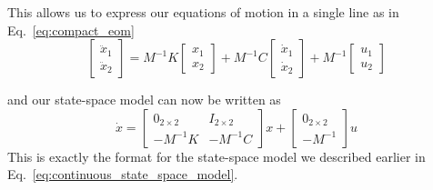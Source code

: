 This allows us to express our equations of motion in a single line as in Eq.~\ref{eq:compact_eom}
\begin{equation}
    \begin{bmatrix}
        \ddot{x}_1 \\ \ddot{x}_2
    \end{bmatrix}
    = M^{-1}K
    \begin{bmatrix}
        x_1 \\ x_2
    \end{bmatrix}
    + M^{-1}C
    \begin{bmatrix}
        \dot{x}_1 \\ \dot{x}_2
    \end{bmatrix}
    + M^{-1}
    \begin{bmatrix}
        u_1 \\ u_2
    \end{bmatrix}
    \label{eq:compact_eom}
\end{equation}

and our state-space model can now be written as
\begin{equation}
    \dot{x}=
    \begin{bmatrix}
        0_{2\times 2} & I_{2\times 2} \\
        -M^{-1}K & -M^{-1}C
    \end{bmatrix}
    x+
    \begin{bmatrix}
        0_{2\times 2} \\ -M^{-1}
    \end{bmatrix}
    u
    \label{eq:spring_mass_state_space_continuous_compact}
\end{equation}
This is exactly the format for the state-space model we described earlier in Eq.~\ref{eq:continuous_state_space_model}.


